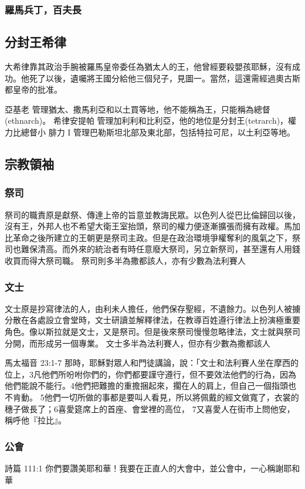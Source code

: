 \subsubsection{羅馬兵丁，百夫長}

\subsection{分封王希律}
大希律靠其政治手腕被羅馬皇帝委任為猶太人的王，他曾經要殺嬰孩耶穌，沒有成功。他死了以後，遺囑將王國分給他三個兒子，見圖一。當然，這還需經過奧古斯都皇帝的批准。

亞基老	管理猶太、撒馬利亞和以土買等地，他不能稱為王，只能稱為總督(ethnarch)。
希律安提帕	管理加利利和比利亞，他的地位是分封王(tetrarch)，權力比總督小
腓力 I	管理巴勒斯坦北部及東北部，包括特拉可尼，以土利亞等地。

\subsection{宗教領袖}
\subsubsection{祭司}

祭司的職責原是獻祭、傳達上帝的旨意並教誨民眾。以色列人從巴比倫歸回以後，沒有王，外邦人也不希望大衛王室抬頭，祭司的權力便逐漸擴張而擁有政權。馬加比革命之後所建立的王朝更是祭司主政。但是在政治環境爭權奪利的風氣之下，祭司也難保清高。而外來的統治者有時任意廢大祭司，另立新祭司，甚至還有人用錢收買而得大祭司職。
祭司則多半為撒都該人，亦有少數為法利賽人
\subsubsection{文士}

文士原是抄寫律法的人，由利未人擔任，他們保存聖經，不遺餘力。以色列人被擄分散在各處設立會堂時，文士研讀並解釋律法，在教導百姓遵行律法上扮演極重要角色。像以斯拉就是文士，又是祭司。但是後來祭司慢慢忽略律法，文士就與祭司分開，而形成另一個專業。
文士多半為法利賽人，但亦有少數為撒都該人

馬太福音 
23:1-7 那時，耶穌對眾人和門徒講論，說：「文士和法利賽人坐在摩西的位上，3凡他們所吩咐你們的，你們都要謹守遵行，但不要效法他們的行為，因為他們能說不能行。4他們把難擔的重擔捆起來，擱在人的肩上，但自己一個指頭也不肯動。 5他們一切所做的事都是要叫人看見，所以將佩戴的經文做寬了，衣裳的穗子做長了；6喜愛筵席上的首座、會堂裡的高位， 7又喜愛人在街市上問他安，稱呼他『拉比』。

\subsubsection{公會}
詩篇 111:1 你們要讚美耶和華！我要在正直人的大會中，並公會中，一心稱謝耶和華

